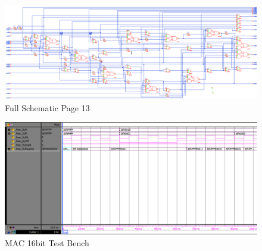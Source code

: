 \documentclass[11pt]{article}
\begin{document}
	
	\begin{figure}[H] 
		\centering 
		\includegraphics[width=0.7\linewidth]{"Pictures/Full Schematic Page 13"}
		\caption{Full Schematic Page 13} 
		\label{fig:Full-Schematic-Page-13} 
	\end{figure}
	
	
	\begin{figure}[H] 
		\centering 
		\includegraphics[width=0.7\linewidth]{"Pictures/MAC-16bit-Test-Bench"}
		\caption{MAC 16bit Test Bench} 
		\label{fig:MAC-16bit-Test-Bench} 
	\end{figure}
	
\end{document}
